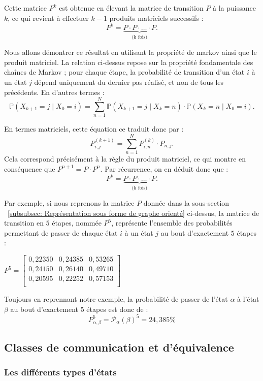 \documentclass{article}
\begin{document}
Cette matrice $P^k$ est obtenue en élevant la matrice de transition $P$ à la puissance $k$, ce qui revient à effectuer $k-1$ produits matriciels successifs :
\[
P^k = \underbrace{P \cdot P \cdot \ldots \cdot P}_\text{(k fois)}.
\]

Nous allons démontrer ce résultat en utilisant la propriété de markov ainsi que le produit matriciel.
La relation ci-dessus repose sur la propriété fondamentale des chaînes de Markov ; pour chaque étape, la probabilité de transition d'un état $i$ à un état $j$ dépend uniquement du dernier pas réalisé, et non de tous les précédents. En d'autres termes :
\[
\mathbb{P}(X_{k+1} = j \mid X_0 = i) = \sum_{n=1}^N \mathbb{P}(X_{k+1} = j \mid X_k = n) \cdot \mathbb{P}(X_k = n \mid X_0 = i).
\]

En termes matriciels, cette équation ce traduit donc par :
\[
P_{i,j}^{(k+1)} = \sum_{n=1}^N P_{i,n}^{(k)} \cdot P_{n,j}.
\]
Cela correspond précisément à la règle du produit matriciel, ce qui montre en conséquence que $P^{n+1} = P \cdot P^n$. Par récurrence, on en déduit donc que :
\[
P^k = \underbrace{P \cdot P \cdot \ldots \cdot P}_\text{(k fois)}.
\]

Par exemple, si nous reprenons la matrice $P$ donnée dans la sous-section ~\ref{subsubsec: Représentation sous forme de graphe orienté} ci-dessus, la matrice de transition en $5$ étapes, nommée $P^{5}$, représente l'ensemble des probabilités permettant de passer de chaque état $i$ à un état $j$ au bout d'exactement $5$ étapes :
\begin{center}
$
P^{5} = \begin{bmatrix}
0,22350 & 0,24385 & 0,53265 \\
0,24150 & 0,26140 & 0,49710 \\
0,20595 & 0,22252 & 0,57153 \\
\end{bmatrix}
$
\end{center}
Toujours en reprennant notre exemple, la probabilité de passer de l'état $\alpha$ à l'état $\beta$ au bout d'exactement $5$ étapes est donc de :
\[
P_{\alpha,\beta}^{5} = \mathcal{P}_\alpha(\beta)^{5} = 24,385\%
\]

\subsection{Classes de communication et d'équivalence}

\subsubsection{Les différents types d'états}
\label{subsubsec: Les différents types d'états}
\end{document}
